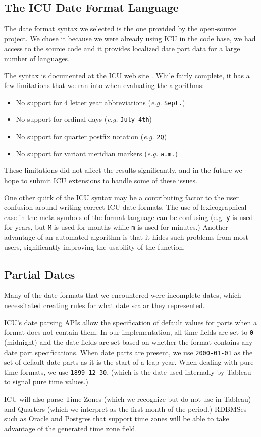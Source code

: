 \subsection{The ICU Date Format Language}
The date format syntax we selected is the one provided by the open-source project. We chose it because we were already using ICU in the code base, we had access to the source code and it provides localized date part data for a large number of languages.

The syntax is documented at the ICU web site \cite{icu}. While fairly complete, it has a few limitations that we ran into when evaluating the algorithms:
\begin{itemize}
\item No support for 4 letter year abbreviations (\textit{e.g.} \texttt{Sept.})
\item No support for ordinal days (\textit{e.g.} \texttt{July 4th})
\item No support for quarter postfix notation (\textit{e.g.} \texttt{2Q})
\item No support for variant meridian markers (\textit{e.g.} \texttt{a.m.})
\end{itemize}

These limitations did not affect the results significantly, and in the future we hope to submit ICU extensions to handle some of these issues.

One other quirk of the ICU syntax may be a contributing factor to the user confusion around writing correct ICU date formats. The use of lexicographical case in the meta-symbols of the format language can be confusing (e.g. \texttt{y} is used for years, but \texttt{M} is used for months while \texttt{m} is used for minutes.) Another advantage of an automated algorithm is that it hides such problems from most users, significantly improving the usability of the function.

\subsection{Partial Dates}
Many of the date formats that we encountered were incomplete dates, which necessitated creating rules for what date scalar they represented.

ICU's date parsing APIs allow the specification of default values for parts when a format does not contain them. In our implementation, all time fields are set to \texttt{0} (midnight) and the date fields are set based on whether the format contains any date part specifications. When date parts are present, we use \texttt{2000-01-01} as the set of default date parts as it is the start of a leap year. When dealing with pure time formats, we use \texttt{1899-12-30}, (which is the date used internally by Tableau to signal pure time values.)

ICU will also parse Time Zones (which we recognize but do not use in Tableau) and Quarters (which we interpret as the first month of the period.) RDBMSes such as Oracle and Postgres that support time zones will be able to take advantage of the generated time zone field.
